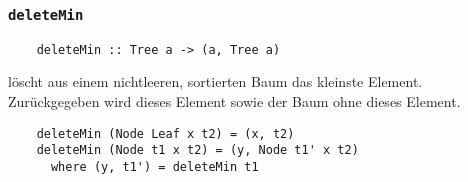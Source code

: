 \documentclass{beamer}
\begin{document}
\begin{frame}[fragile]
  \frametitle{\lstinline{deleteMin}}
  \begin{lstlisting}
    deleteMin :: Tree a -> (a, Tree a)
  \end{lstlisting}
  löscht aus einem nichtleeren, sortierten Baum das kleinste Element.
  Zurückgegeben wird dieses Element sowie der Baum ohne dieses Element.
  \pause
  \begin{lstlisting}
    deleteMin (Node Leaf x t2) = (x, t2)
    deleteMin (Node t1 x t2) = (y, Node t1' x t2)
      where (y, t1') = deleteMin t1
  \end{lstlisting}
\end{frame}
\end{document}
